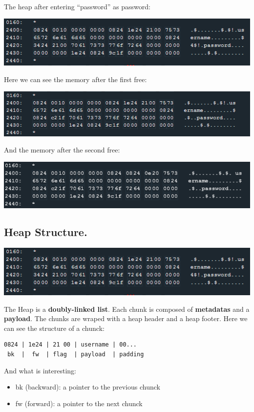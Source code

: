 \documentclass[a4paper,11pt]{article}
\begin{document}
The heap after entering ``password'' as password:

\includegraphics{img/14_9.PNG}

Here we can see the memory after the first free:

\includegraphics{img/14_10.PNG}

And the memory after the second free:

\includegraphics{img/14_11.PNG}

\subsection{Heap Structure.}\label{heap-structure.}

\includegraphics{img/14_9.PNG}

The Heap is a \textbf{doubly-linked list}. Each chunk is composed of
\textbf{metadatas} and a \textbf{payload}. The chunks are wraped with a
heap header and a heap footer. Here we can see the structure of a
chunck:

\begin{verbatim}
0824 | 1e24 | 21 00 | username | 00...
 bk  |  fw  | flag  | payload  | padding
\end{verbatim}

And what is interesting:

\begin{itemize}
\itemsep1pt\parskip0pt
\item
  bk (backward): a pointer to the previous chunck
\item
  fw (forward): a pointer to the next chunck
\end{itemize}
\end{document}
